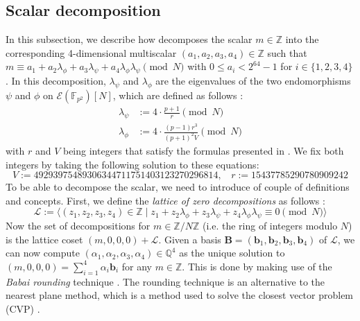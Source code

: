 \subsection{Scalar decomposition} \label{subsec: Scalar decomposition}
In this subsection, we describe how {\fourq} decomposes the scalar $m \in \mathbb{Z}$ into the corresponding 4-dimensional multiscalar $(a_1, a_2, a_3, a_4) \in \mathbb{Z}$ such that $m \equiv a_1 + a_2 \lambda_\phi + a_3 \lambda_\psi + a_4 \lambda_\phi \lambda_\psi \pmod{N}$ with $0 \le a_i < 2^{64} - 1$ for $i \in \{1,2,3,4\}$.
In this decomposition, $\lambda_\psi$ and $\lambda_\phi$ are the eigenvalues of the two endomorphisms $\psi$ and $\phi$ on $\mathcal{E}(\mathbb{F}_{p^2}) \left[ N \right]$, which are defined as follows \cite{costello2015fourq}:
%
\begin{align*}
\lambda_\psi &:= 4 \cdot \frac{p + 1}{r} \pmod{N} \\
\lambda_\phi & := 4 \cdot \frac{(p - 1) r^3}{(p + 1)^2 V} \pmod{N}
\end{align*}
%
with $r$ and $V$ being integers that satisfy the formulas presented in \cite[§3.3]{costello2015fourq}. 
We fix both integers by taking the following solution to these equations:
%
\begin{equation*}
V := 49293975489306344711751403123270296814, ~~~~ r := 15437785290780909242
\end{equation*}
%
To be able to decompose the scalar, we need to introduce of couple of definitions and concepts.
First, we define the \textit{lattice of zero decompositions} as follows \cite{costello2015fourq}:
%
\begin{equation*}
\mathcal{L} := \langle (z_1, z_2, z_3, z_4) \in  \mathbb{Z} \mid  z_1 + z_2 \lambda_\phi + z_3 \lambda_\psi + z_4 \lambda_\phi \lambda_\psi \equiv 0 \pmod{N} \rangle
\end{equation*}
%
Now the set of decompositions for $m \in \mathbb{Z} / N \mathbb{Z} $ (i.e. the ring of integers modulo $N$) is the lattice coset $(m, 0, 0, 0) + \mathcal{L}$.
Given a basis $\bm{B} = (\bm{b}_1, \bm{b}_2, \bm{b}_3, \bm{b}_4)$ of $\mathcal{L}$, we can now compute $(\alpha_1, \alpha_2, \alpha_3, \alpha_4) \in \mathbb{Q}^4$ as the unique solution to  $(m, 0, 0, 0) = \sum_{i=1}^{4} \alpha_i \bm{b}_i$ for any $m \in \mathbb{Z}$. This is done by making use of the \emph{Babai rounding} technique \cite{babai1986lovasz}.
The rounding technique is an alternative to the nearest plane method, which is a method used to solve the closest vector problem (CVP) \cite{galbraith2012mathematics}.
